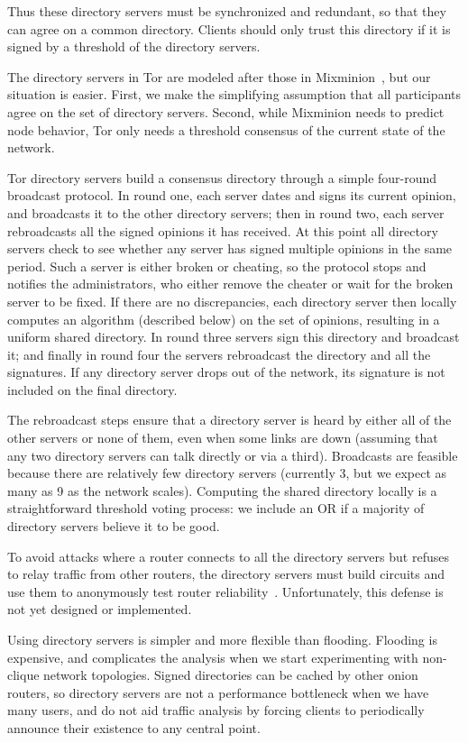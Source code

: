 \documentclass[times,10pt,twocolumn]{article}
\begin{document}
Thus these directory servers must be synchronized and redundant, so
that they can agree on a common directory.  Clients should only trust
this directory if it is signed by a threshold of the directory
servers.

The directory servers in Tor are modeled after those in
Mixminion~\cite{minion-design}, but our situation is easier. First,
we make the
simplifying assumption that all participants agree on the set of
directory servers. Second, while Mixminion needs to predict node
behavior, Tor only needs a threshold consensus of the current
state of the network.

Tor directory servers build a consensus directory through a simple
four-round broadcast protocol.  In round one, each server dates and
signs its current opinion, and broadcasts it to the other directory
servers; then in round two, each server rebroadcasts all the signed
opinions it has received.  At this point all directory servers check
to see whether any server has signed multiple opinions in the same
period. Such a server is either broken or cheating, so the protocol
stops and notifies the administrators, who either remove the cheater
or wait for the broken server to be fixed.  If there are no
discrepancies, each directory server then locally computes an algorithm
(described below)
on the set of opinions, resulting in a uniform shared directory. In
round three servers sign this directory and broadcast it; and finally
in round four the servers rebroadcast the directory and all the
signatures.  If any directory server drops out of the network, its
signature is not included on the final directory.

The rebroadcast steps ensure that a directory server is heard by
either all of the other servers or none of them, even when some links
are down (assuming that any two directory servers can talk directly or
via a third). Broadcasts are feasible because there are relatively few
directory servers (currently 3, but we expect as many as 9 as the network
scales). Computing the shared directory locally is a straightforward
threshold voting process: we include an OR if a majority of directory
servers believe it to be good.

To avoid attacks where a router connects to all the directory servers
but refuses to relay traffic from other routers, the directory servers
must build circuits and use them to anonymously test router
reliability~\cite{mix-acc}. Unfortunately, this defense is not yet
designed or
implemented.

Using directory servers is simpler and more flexible than flooding.
Flooding is expensive, and complicates the analysis when we
start experimenting with non-clique network topologies. Signed
directories can be cached by other
onion routers,
so directory servers are not a performance
bottleneck when we have many users, and do not aid traffic analysis by
forcing clients to periodically announce their existence to any
central point.
\end{document}

